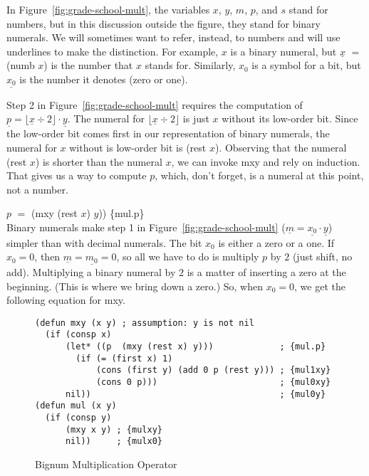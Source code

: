 In Figure~\ref{fig:grade-school-mult}, the variables $x$, $y$, $m$, $p$, and $s$
stand for numbers, but in this discussion outside the figure,
they stand for binary numerals.
We will sometimes want to refer, instead, to numbers
and will use underlines to make the distinction.
For example, $x$ is a binary numeral,
but $\underline{x}$ $=$ \textsf{(numb $x$)}
is the number that $x$ stands for.
Similarly, $x_0$ is a symbol for a bit,
but $\underline{x_0}$ is the number it denotes (zero or one).

Step 2 in Figure~\ref{fig:grade-school-mult} requires the computation of
$\underline{p} = \lfloor \underline{x} \div 2 \rfloor \cdot \underline{y}$.
The numeral for $\lfloor \underline{x} \div 2 \rfloor$ is just $x$ without its
low-order bit. Since the low-order bit comes first
in our representation of binary numerals,
the numeral for $x$ without is low-order bit is \textsf{(rest $x$)}.
Observing that the numeral \textsf{(rest $x$)}
is shorter than the numeral $x$,
we can invoke \textsf{mxy} and rely on induction.
That gives us a way to compute $p$, which, don't forget,
is a numeral at this point, not a number.

\vspace{2mm}\hspace*{2cm} $p$ $=$ \textsf{(mxy (rest $x$) $y$))} \hfill \{mul.p\}\\

Binary numerals make step 1 in Figure~\ref{fig:grade-school-mult}
($\underline{m} = \underline{x_0} \cdot \underline{y}$)
simpler than with decimal numerals.
The bit $x_0$ is either a zero or a one.
If $x_0 = 0$, then $\underline{m} = \underline{m_0} = 0$, so all
we have to do is multiply $p$ by $2$ (just shift, no add).
Multiplying a binary numeral by $2$ is a matter
of inserting a zero at the beginning.
(This is where we bring down a zero.)
So, when $x_0 = 0$, we get the following equation for \textsf{mxy}.

\begin{figure}
\begin{code}
\begin{verbatim}
(defun mxy (x y) ; assumption: y is not nil
  (if (consp x)
      (let* ((p  (mxy (rest x) y)))             ; {mul.p}
        (if (= (first x) 1)
            (cons (first y) (add 0 p (rest y))) ; {mul1xy}
            (cons 0 p)))                        ; {mul0xy}
      nil))                                     ; {mul0y}
(defun mul (x y)
  (if (consp y)
      (mxy x y) ; {mulxy}
      nil))     ; {mulx0}
\end{verbatim}
\end{code}
\label{bignum-mul-defun}
\caption{Bignum Multiplication Operator}
\label{fig:bignum-mul-defun}
\end{figure}

